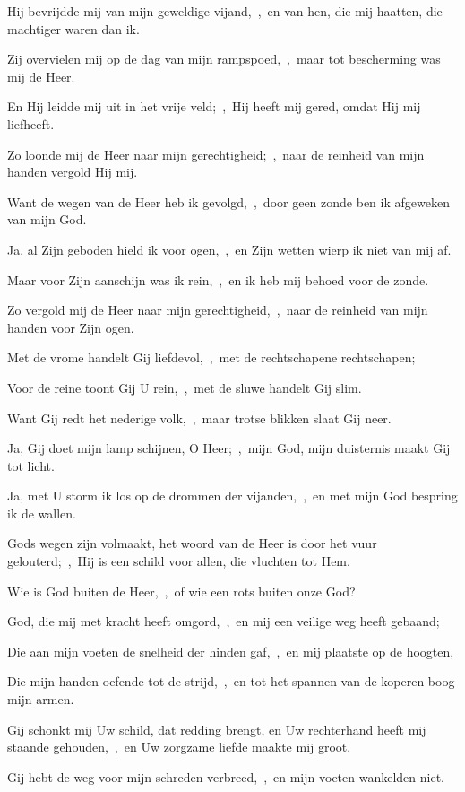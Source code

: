 \documentclass[12pt,twoside,a5paper]{article}
\begin{document}
\begin{halfparskip}
  Hij bevrijdde mij van mijn geweldige vijand,~\sep\ en van hen, die mij haatten, die machtiger waren dan ik.

  Zij overvielen mij op de dag van mijn rampspoed,~\sep\ maar tot bescherming was mij de Heer.

  En Hij leidde mij uit in het vrije veld;~\sep\ Hij heeft mij gered, omdat Hij mij liefheeft.

  Zo loonde mij de Heer naar mijn gerechtigheid;~\sep\ naar de reinheid van mijn handen vergold Hij mij.

  Want de wegen van de Heer heb ik gevolgd,~\sep\ door geen zonde ben ik afgeweken van mijn God.

  Ja, al Zijn geboden hield ik voor ogen,~\sep\ en Zijn wetten wierp ik niet van mij af.

  Maar voor Zijn aanschijn was ik rein,~\sep\ en ik heb mij behoed voor de zonde.

  Zo vergold mij de Heer naar mijn gerechtigheid,~\sep\ naar de reinheid van mijn handen voor Zijn ogen.

  Met de vrome handelt Gij liefdevol,~\sep\ met de rechtschapene rechtschapen;

  Voor de reine toont Gij U rein,~\sep\ met de sluwe handelt Gij slim.

  Want Gij redt het nederige volk,~\sep\ maar trotse blikken slaat Gij neer.

  Ja, Gij doet mijn lamp schijnen, O Heer;~\sep\ mijn God, mijn duisternis maakt Gij tot licht.

  Ja, met U storm ik los op de drommen der vijanden,~\sep\ en met mijn God bespring ik de wallen.

  Gods wegen zijn volmaakt, het woord van de Heer is door het vuur gelouterd;~\sep\ Hij is een schild voor allen, die vluchten tot Hem.

  Wie is God buiten de Heer,~\sep\ of wie een rots buiten onze God?

  God, die mij met kracht heeft omgord,~\sep\ en mij een veilige weg heeft gebaand;

  Die aan mijn voeten de snelheid der hinden gaf,~\sep\ en mij plaatste op de hoogten,

  Die mijn handen oefende tot de strijd,~\sep\ en tot het spannen van de koperen boog mijn armen.

  Gij schonkt mij Uw schild, dat redding brengt, en Uw rechterhand heeft mij staande gehouden,~\sep\ en Uw zorgzame liefde maakte mij groot.

  Gij hebt de weg voor mijn schreden verbreed,~\sep\ en mijn voeten wankelden niet.


\end{halfparskip}
\end{document}
